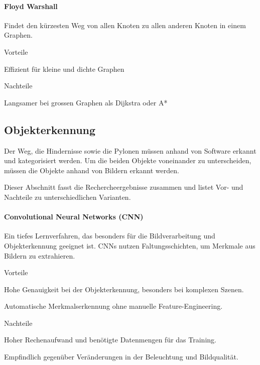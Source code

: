 \documentclass[../main.tex]{subfiles}
\begin{document}
\paragraph{Floyd Warshall}
Findet den kürzesten Weg von allen Knoten zu allen anderen Knoten in einem Graphen.

\begin{minipage}[t]{0.48\textwidth}
\begin{items}
  \item [Vorteile]
  \item Effizient für kleine und dichte Graphen
\end{items}
\end{minipage}
\hfill
\begin{minipage}[t]{0.48\textwidth}
\begin{items}
  \item [Nachteile]
  \item Langsamer bei grossen Graphen als Dijkstra oder A* 
\end{items}
\end{minipage}

\subsection{Objekterkennung}

Der Weg, die Hindernisse sowie die Pylonen müssen anhand von Software erkannt und kategorisiert werden. Um die beiden Objekte voneinander zu unterscheiden, müssen die Objekte anhand von Bildern erkannt werden.

Dieser Abschnitt fasst die Rechercheergebnisse zusammen und listet Vor- und Nachteile zu unterschiedlichen Varianten.

\paragraph{Convolutional Neural Networks (CNN)}

Ein tiefes Lernverfahren, das besonders für die Bildverarbeitung und Objekterkennung geeignet ist. CNNs nutzen Faltungsschichten, um Merkmale aus Bildern zu extrahieren.

\begin{minipage}[t]{0.48\textwidth}
\begin{items}
  \item [Vorteile]
  \item Hohe Genauigkeit bei der Objekterkennung, besonders bei komplexen Szenen.
  \item Automatische Merkmalserkennung ohne manuelle Feature-Engineering.
\end{items}
\end{minipage}
\hfill
\begin{minipage}[t]{0.48\textwidth}
\begin{items}
  \item [Nachteile]
  \item Hoher Rechenaufwand und benötigte Datenmengen für das Training.
  \item Empfindlich gegenüber Veränderungen in der Beleuchtung und Bildqualität.
\end{items}
\end{minipage}
\end{document}
